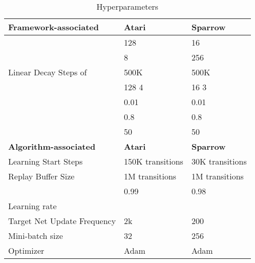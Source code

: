 \documentclass[journal]{IEEEtran}
\begin{document}
\begin{table}[htbp]
	\centering
	\caption{Hyperparameters}
	\begin{tabular}{lll}
		\hline
		\textbf{Framework-associated} & \textbf{Atari} & \textbf{Sparrow} \\
		\hline
		 & 128 & 16 \\
		 & 8 & 256 \\
		Linear Decay Steps of  & 500K  & 500K  \\
		 & 128  4 & 16  3 \\
		 & 0.01 & 0.01 \\
		 & 0.8 & 0.8 \\
		 & 50  & 50  \\
		\hline
		\hline
		\textbf{Algorithm-associated} & \textbf{Atari} & \textbf{Sparrow} \\
		\hline
		Learning Start Steps  & 150K transitions & 30K transitions\\
		Replay Buffer Size & 1M transitions & 1M transitions \\
		 & 0.99 & 0.98 \\
		Learning rate &  &  \\
		Target Net Update Frequency & 2k  & 200  \\
		Mini-batch size & 32 & 256 \\
		Optimizer & Adam  & Adam \\
		\hline
	\end{tabular}\label{tab:hp}\end{table}




\newpage



	
\end{document}
